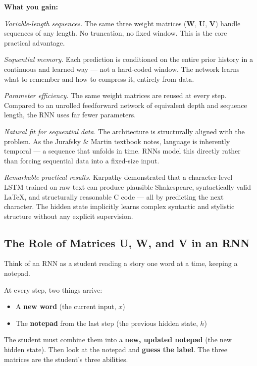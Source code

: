 \bigskip
\noindent\textbf{What you gain:}

\medskip
\noindent\textit{Variable-length sequences.}
The same three weight matrices ($\mathbf{W}$, $\mathbf{U}$, $\mathbf{V}$) handle
sequences of any length. No truncation, no fixed window. This is the core practical
advantage.

\medskip
\noindent\textit{Sequential memory.}
Each prediction is conditioned on the entire prior history in a continuous and learned
way --- not a hard-coded window. The network learns what to remember and how to compress
it, entirely from data.

\medskip
\noindent\textit{Parameter efficiency.}
The same weight matrices are reused at every step. Compared to an unrolled feedforward
network of equivalent depth and sequence length, the RNN uses far fewer parameters.

\medskip
\noindent\textit{Natural fit for sequential data.}
The architecture is structurally aligned with the problem. As the Jurafsky \& Martin
textbook notes, language is inherently temporal --- a sequence that unfolds in time.
RNNs model this directly rather than forcing sequential data into a fixed-size input.

\medskip
\noindent\textit{Remarkable practical results.}
Karpathy demonstrated that a character-level LSTM trained on raw text can produce
plausible Shakespeare, syntactically valid \LaTeX, and structurally reasonable C code
--- all by predicting the next character. The hidden state implicitly learns complex
syntactic and stylistic structure without any explicit supervision.

\subsection{The Role of Matrices U, W, and V in an RNN}

Think of an RNN as a student reading a story one word at a time, keeping a notepad.

At every step, two things arrive:
\begin{itemize}
    \item A \textbf{new word} (the current input, $x$)
    \item The \textbf{notepad} from the last step (the previous hidden state, $h$)
\end{itemize}

The student must combine them into a \textbf{new, updated notepad} (the new hidden state). Then look at the notepad and \textbf{guess the label}. The three matrices are the student's three abilities.

